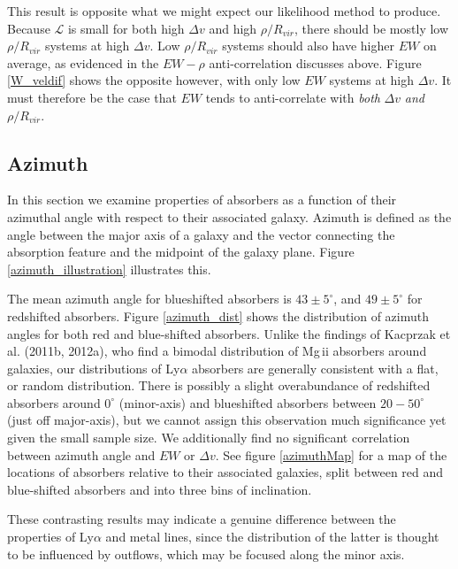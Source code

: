 \documentclass[twocolumn,tighten]{aastex6}
\begin{document}
This result is opposite what we might expect our likelihood method to produce. Because $\mathcal{L}$ is small for both high $\Delta v$ and high $\rho / R_{vir}$, there should be mostly low $\rho / R_{vir}$ systems at high $\Delta v$. Low $\rho / R_{vir}$ systems should also have higher $EW$ on average, as evidenced in the $EW-\rho$ anti-correlation discusses above. Figure \ref{W_veldif} shows the opposite however, with only low $EW$ systems at high $\Delta v$. It must therefore be the case that $EW$ tends to anti-correlate with \textit{both} $\Delta v$ \textit{and} $\rho / R_{vir}$.


\subsection{Azimuth}

In this section we examine properties of absorbers as a function of their azimuthal angle with respect to their associated galaxy. Azimuth is defined as the angle between the major axis of a galaxy and the vector connecting the absorption feature and the midpoint of the galaxy plane. Figure \ref{azimuth_illustration} illustrates this. 

The mean azimuth angle for blueshifted absorbers is $43\pm5^{\circ}$, and $49\pm5^{\circ}$ for redshifted absorbers. Figure \ref{azimuth_dist} shows the distribution of azimuth angles for both red and blue-shifted absorbers. Unlike the findings of Kacprzak et al. (2011b, 2012a), who find a bimodal distribution of Mg\,{\sc ii} absorbers around galaxies, our distributions of Ly$\alpha$ absorbers are generally consistent with a flat, or random distribution. There is possibly a slight overabundance of redshifted absorbers around $0^{\circ}$ (minor-axis) and blueshifted absorbers between $20-50^{\circ}$ (just off major-axis), but we cannot assign this observation much significance yet given the small sample size. We additionally find no significant correlation between azimuth angle and $EW$ or $\Delta v$. See figure \ref{azimuthMap} for a map of the locations of absorbers relative to their associated galaxies, split between red and blue-shifted absorbers and into three bins of inclination.

These contrasting results may indicate a genuine difference between the properties of Ly$\alpha$ and metal lines, since the distribution of the latter is thought to be influenced by outflows, which may be focused along the minor axis.
\end{document}
